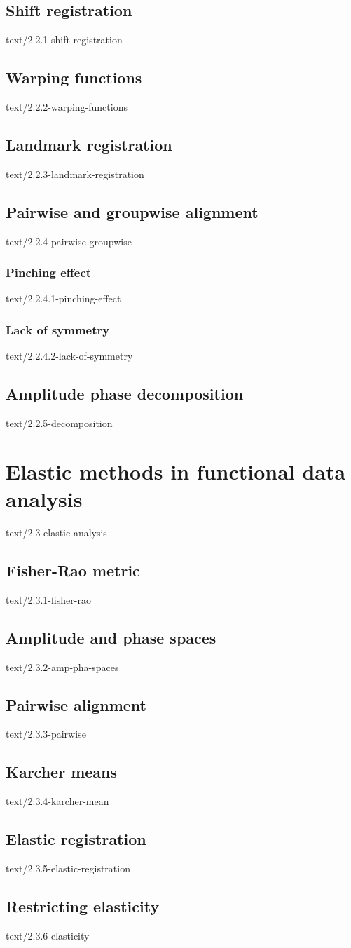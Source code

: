 \documentclass[epsbased,copyleft,final,extendedindex,firstnumbered,tfg, english]{tfgtfmthesisuam}
\begin{document}
    \subsection{Shift registration\label{SEC:SHIFT}}{text/2.2.1-shift-registration}
    \subsection{Warping functions\label{SEC:WARPING}}{text/2.2.2-warping-functions}
    \subsection{Landmark registration\label{SEC:LANDMARK}}{text/2.2.3-landmark-registration}
    \subsection{Pairwise and groupwise alignment\label{SEC:L2PAIRWISE}}{text/2.2.4-pairwise-groupwise}
      \subsubsection{Pinching effect\label{SSEC:PINCHING}}{text/2.2.4.1-pinching-effect}
      \subsubsection{Lack of symmetry\label{SSEC:SIMMETRY}}{text/2.2.4.2-lack-of-symmetry}
    \subsection{Amplitude phase decomposition\label{SEC:DECOMPOSITION}}{text/2.2.5-decomposition}

    \section{Elastic methods in functional data analysis\label{SEC:ELASTIC}}{text/2.3-elastic-analysis}
      \subsection{Fisher-Rao metric\label{SEC:FISHERRAO}}{text/2.3.1-fisher-rao}
      \subsection{Amplitude and phase spaces\label{SEC:AMPPHA}}{text/2.3.2-amp-pha-spaces}
      \subsection{Pairwise alignment\label{SEC:PAIRWISE}}{text/2.3.3-pairwise}
      \subsection{Karcher means\label{SEC:KARCHER}}{text/2.3.4-karcher-mean}
      \subsection{Elastic registration\label{SEC:ELASTICREG}}{text/2.3.5-elastic-registration}
      \subsection{Restricting elasticity\label{SEC:RESTRICT}}{text/2.3.6-elasticity}
\end{document}
